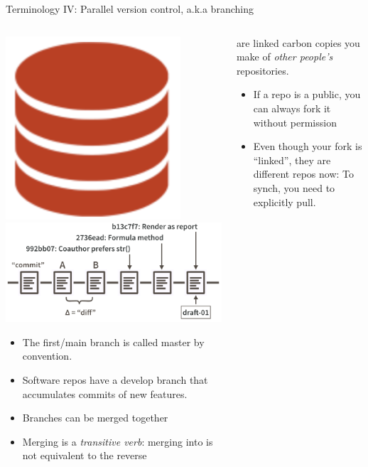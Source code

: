 \documentclass[ignorenonframetext, 10pt, aspectratio=169]{beamer}
\begin{document}
\begin{frame}{Terminology IV: Parallel version control, a.k.a branching}
\begin{columns}[T]
\begin{column}{0.5\textwidth}

\centering
\includegraphics[width =0.25\linewidth]{repo-0.png} \hspace{-1em}~ \includegraphics[width =0.5\linewidth]{commit-diff-sha-tag.png}

\small
\begin{itemize}
  \item The first/main branch is called \alert{master} by convention. \pause
  \item Software repos have a \alert{develop} branch that accumulates commits of new features.\pause
  \item Branches can be \alert{merged} together
  \item Merging is a \emph{transitive verb}: merging  into  is not equivalent to the reverse
\end{itemize}
\end{column}


\begin{column}{0.25\textwidth}
are linked carbon copies you make of \emph{other people's} repositories.\\


\small 
\begin{itemize}
\item If a repo is a public, you can always fork it without permission
\item Even though your fork is ``linked'', they are different repos now: To synch, you need to explicitly pull.
\end{itemize}



\end{column}
\end{columns}
\end{frame}
\end{document}
